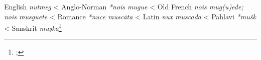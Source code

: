 \begin{etymology}\label{ety:nutmeg}
English \textit{nutmeg}
< Anglo-Norman \textit{*nois mugue}
< Old French \textit{nois mug(u)ede; nois musguete}
< Romance \textit{*nuce muscāta}
< Latin \textit{nux muscada}
< Pahlavi \textit{*mušk}
< Sanskrit \textit{muṣka}\footnote{; }
\end{etymology}